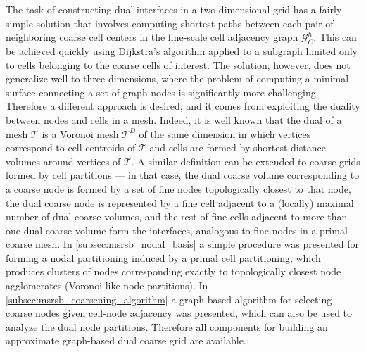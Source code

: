 The task of constructing dual interfaces in a two-dimensional grid has a fairly simple solution that involves computing shortest paths between each pair of neighboring coarse cell centers in the fine-scale cell adjacency graph $\mathcal{G}_C^h$.   This can be achieved quickly using Dijkstra's algorithm applied to a subgraph limited only to cells belonging to the coarse cells of interest.   The solution, however, does not generalize well to three dimensions, where the problem of computing a minimal surface connecting a set of graph nodes is significantly more challenging.   Therefore a different approach is desired, and it comes from exploiting the duality between nodes and cells in a mesh.   Indeed, it is well known that the dual of a mesh $\mathcal{T}$ is a Voronoi mesh $\mathcal{T}^D$ of the same dimension in which vertices correspond to cell centroids of $\mathcal{T}$ and cells are formed by shortest-distance volumes around vertices of $\mathcal{T}$.   A similar definition can be extended to coarse grids formed by cell partitions --- in that case, the dual coarse volume corresponding to a coarse node is formed by a set of fine nodes topologically closest to that node, the dual coarse node is represented by a fine cell adjacent to a (locally) maximal number of dual coarse volumes, and the rest of fine cells adjacent to more than one dual coarse volume form the interfaces, analogous to fine nodes in a primal coarse mesh.   In \autoref{subsec:msrsb_nodal_basis} a simple procedure was presented for forming a nodal partitioning induced by a primal cell partitioning, which produces clusters of nodes corresponding exactly to topologically closest node agglomerates (Voronoi-like node partitions).   In \autoref{subsec:msrsb_coarsening_algorithm} a graph-based algorithm for selecting coarse nodes given cell-node adjacency was presented, which can also be used to analyze the dual node partitions.   Therefore all components for building an approximate graph-based dual coarse grid are available.   

